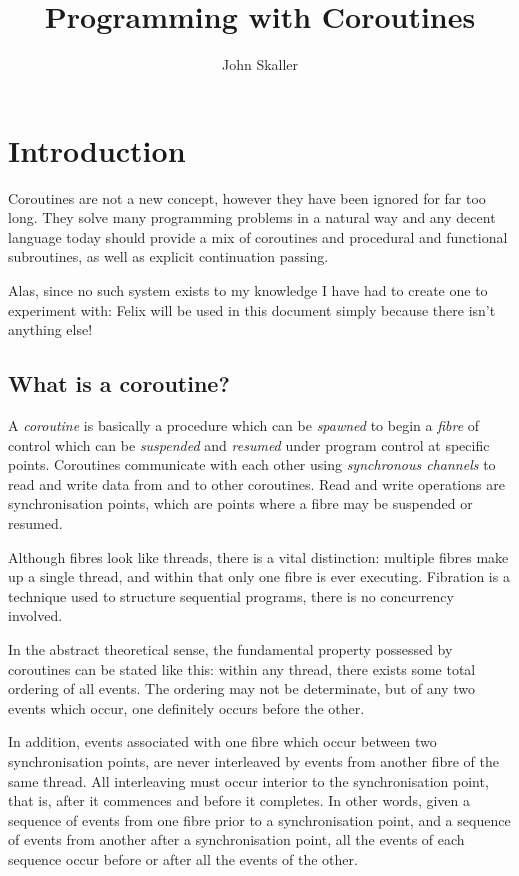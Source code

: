 \documentclass[oneside]{book}
\title{Programming with Coroutines}
\author{John Skaller}
\begin{document}
\maketitle
\tableofcontents
\chapter{Introduction}
Coroutines are not a new concept, however they have been ignored for
far too long. They solve many programming problems in a natural way and
any decent language today should provide a mix of coroutines and procedural
and functional subroutines, as well as explicit continuation passing.

Alas, since no such system exists to my knowledge I have had to create
one to experiment with: Felix will be used in this document simply
because there isn't anything else!

\section{What is a coroutine?}
A {\em coroutine} is basically a procedure which can be {\em spawned} to begin
a {\em fibre} of control which can be {\em suspended} and {\em resumed} under program
control at specific points. Coroutines communicate with each other
using {\em synchronous channels} to read and write data from and to other
coroutines. Read and write operations are synchronisation points,
which are points where a fibre may be suspended or resumed.

Although fibres look like threads, there is a vital distinction: multiple
fibres make up a single thread, and within that only one fibre is ever
executing. Fibration is a technique used to structure sequential programs,
there is no concurrency involved.

In the abstract theoretical sense, the fundamental property possessed by
coroutines can be stated like this: within any thread, there exists some
total ordering of all events. The ordering may not be determinate, but of any two
events which occur, one definitely occurs before the other.

In addition, events associated with one fibre which occur between two synchronisation
points, are never interleaved by events from another fibre of the same thread.
All interleaving must occur interior to the synchronisation point, that is,
after it commences and before it completes. In other words, given a sequence
of events from one fibre prior to a synchronisation point, and a sequence of
events from another after a synchronisation point, all the events of each
sequence occur before or after all the events of the other.
\end{document}
